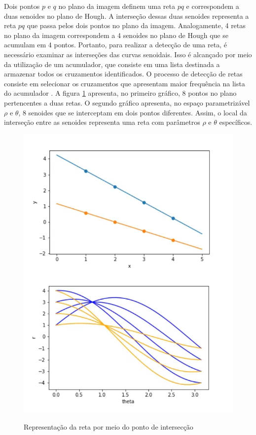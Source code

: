 Dois pontos $p$ e $q$ no plano da imagem definem uma reta $pq$ e correspondem a duas senoides no plano de Hough. A interseção dessas duas senoides representa a reta $pq$ que passa pelos dois pontos no plano da imagem. Analogamente, 4 retas no plano da imagem correspondem a 4 senoides no plano de Hough que se acumulam em 4 pontos. Portanto, para realizar a detecção de uma reta, é necessário examinar as interseções das curvas senoidais. Isso é alcançado por meio da utilização de um acumulador, que consiste em uma lista destinada a armazenar todos os cruzamentos identificados. O processo de detecção de retas consiste em selecionar os cruzamentos que apresentam maior frequência na lista do acumulador \cite{transformadaHough2}. A figura \ref{fig:Representacao da reta por meio do ponto de interseccao} apresenta, no primeiro gráfico, 8 pontos no plano pertencentes a duas retas. O segundo gráfico apresenta, no espaço parametrizável $\rho$ e $\theta$, 8 senoides que se interceptam em dois pontos diferentes. Assim, o local da interseção entre as senoides representa uma reta com parâmetros $\rho$ e $\theta$ específicos.


\begin{figure}[H]
	\centering
    \caption{Representação da reta por meio do ponto de intersecção}
	\includegraphics[scale=0.5]{figuras/math/senoidesIterseccao.png}
	\label{fig:Representacao da reta por meio do ponto de interseccao}
\end{figure}




